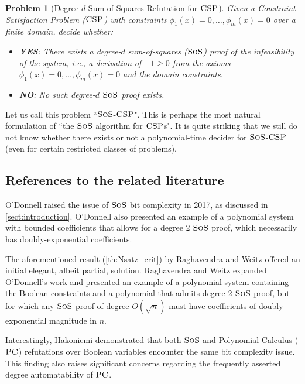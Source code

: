 \documentclass[11pt]{article}
\newcommand{\sos}{\text{\sc{SoS}}}
\newcommand{\CSP}{\textsc{CSP}}
\newcommand{\PC}{\textsc{PC}}
\newcommand{\1}{\textbf{1}}
\newtheorem{problem}[theorem]{Problem}
\begin{document}
\begin{problem}[Degree-$d$ Sum-of-Squares Refutation for $\CSP$]\label{prob:sos-csp}
Given a Constraint Satisfaction Problem (\(\CSP\)) with constraints \(\phi_1(x) = 0, \dots, \phi_m(x) = 0\) over a finite domain, decide whether:
\begin{itemize}
    \item \textbf{YES}: There exists a degree-\(d\) sum-of-squares (\(\sos\)) proof of the infeasibility of the system, i.e., a derivation of \(-1 \geq 0\) from the axioms \(\phi_1(x) = 0, \dots, \phi_m(x) = 0\) and the domain constraints.
    \item \textbf{NO}: No such degree-\(d\) \(\sos\) proof exists.
\end{itemize}
\end{problem}
%
Let us call this problem ``$\sos$-$\CSP$". This is perhaps the most natural formulation of ``the $\sos$ algorithm for $\CSP$s". 
It is quite striking that we still do not know whether there exists or not a polynomial-time decider for $\sos$-$\CSP$ (even for certain restricted classes of problems).

\subsection*{References to the related literature}\label{sect:previous_work}
O'Donnell \cite{odonnell2017} raised the issue of \(\sos\) bit complexity in 2017, as discussed in \cref{sect:introduction}. 
O'Donnell also presented an example of a polynomial system with bounded coefficients that allows for a degree 2 \(\sos\) proof, which necessarily has doubly-exponential coefficients.

The aforementioned result (\cref{th:Nsatz_crit}) by Raghavendra and Weitz \cite{raghavendra_weitz2017} offered an initial elegant, albeit partial, solution.
Raghavendra and Weitz expanded O'Donnell's work and presented an example of a polynomial system containing the Boolean constraints and a polynomial that admits degree 2 $\sos$ proof, but for which any $\sos$ proof of degree $O(\sqrt{n})$ must have coefficients of doubly-exponential magnitude in $n$.

Interestingly, Hakoniemi \cite{Hakoniemi21} demonstrated that both \(\sos\) and Polynomial Calculus ($\PC$)  refutations over Boolean variables encounter the same bit complexity issue. This finding also raises significant concerns regarding the frequently asserted degree automatability of \(\PC\).
\end{document}
